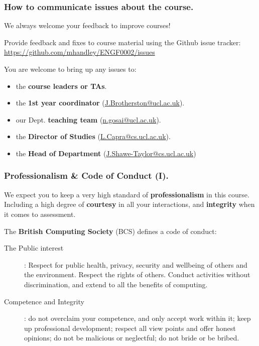 \documentclass{beamer} %
\newcommand\emc[1]{\textcolor{midred}{\textbf{#1}}}
\begin{document}
\begin{frame}
\frametitle{How to communicate issues about the course.}

We always welcome your feedback to improve courses!

\vspace{3mm}
Provide feedback and fixes to course material using the Github issue tracker:
\url{https://github.com/mhandley/ENGF0002/issues}

\vspace{3mm}
You are welcome to bring up any issues to:
\begin{itemize}
	\item the \emc{course leaders or TAs}.
	\item the \emc{1st year coordinator} (\url{J.Brotherston@ucl.ac.uk}).
	\item our Dept. \emc{teaching team} (\url{n.gosai@ucl.ac.uk}).
	\item the \emc{Director of Studies} (\url{L.Capra@cs.ucl.ac.uk}).
	\item the \emc{Head of Department} (\url{J.Shawe-Taylor@cs.ucl.ac.uk})
\end{itemize}

\end{frame}

\begin{frame}
\frametitle{Professionalism \& Code of Conduct (I).}

We expect you to keep a very high standard of \emc{professionalism} in this course. Including a high degree of \emc{courtesy} in all your interactions, and \emc{integrity} when it comes to assessment.

\vspace{3mm}
The \emc{British Computing Society} (BCS) defines a code of conduct:
\begin{description}
	\item[The Public interest]: Respect for public health, privacy, security and wellbeing of others and the environment. Respect the rights of others. Conduct activities without discrimination, and extend to all the benefits of computing.
	\item[Competence and Integrity]: do not overclaim your competence, and only accept work within it; keep up professional development; respect all view points and offer honest opinions; do not be malicious or neglectful; do not bride or be bribed.
\end{description}

\end{frame}
\end{document}
